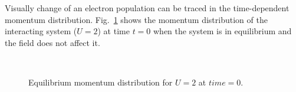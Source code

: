 Visually change of an electron population can be traced in the time-dependent momentum distribution. Fig.~\ref{fig:md_u2_t0} shows the momentum distribution of the interacting system ($U=2$) at time $t=0$ when the system is in equilibrium and the field does not affect it.
\begin{figure}[h!]
 \\
\caption{Equilibrium momentum distribution for $U=2$ at $time=0$.}
\label{fig:md_u2_t0}
\end{figure}

